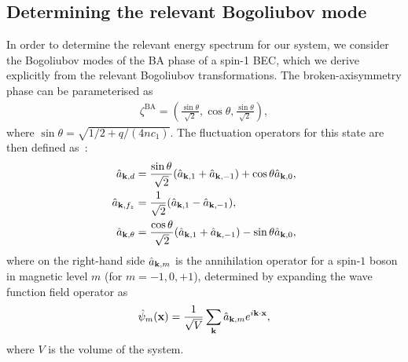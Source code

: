 \subsection{Determining the relevant Bogoliubov mode}\label{subsec: bogoliubov-modes}
In order to determine the relevant energy spectrum for our system, we consider
the Bogoliubov modes of the BA phase of a spin-1 BEC, which we derive explicitly
from the relevant Bogoliubov transformations.
The broken-axisymmetry phase can be parameterised as~\cite{Uchino2010}
\begin{align}
    \zeta^\text{BA} = \left(\frac{\sin\theta}{\sqrt{2}}, \cos\theta,
    \frac{\sin\theta}{\sqrt{2}}\right),
\end{align}
where \(\sin\theta = \sqrt{1/2+q/(4nc_1)}\).
The fluctuation operators for this state are then defined as~\cite{Uchino2010}:
\begin{align}
    \hat{a}_{\vb{k}, d} &= \frac{\sin\theta}{\sqrt{2}}(\hat{a}_{\vb{k}, 1}
    + \hat{a}_{\vb{k}, -1}) + \cos\theta \hat{a}_{\vb{k}, 0}, \\
    \hat{a}_{\vb{k}, f_z} &= \frac{1}{\sqrt{2}}(\hat{a}_{\vb{k}, 1}
    - \hat{a}_{\vb{k}, -1}), \label{eq: a_k-fz}\\
    \hat{a}_{\vb{k}, \theta} &= \frac{\cos\theta}{\sqrt{2}}(\hat{a}_{\vb{k}, 1}
    + \hat{a}_{\vb{k}, -1}) - \sin\theta \hat{a}_{\vb{k}, 0},
\end{align}
where on the right-hand side \(\hat{a}_{\vb{k}, m}\) is the annihilation
operator for a spin-\(1\) boson in magnetic level \(m\) (for \(m=-1,0,+1\)),
determined by expanding the wave function field operator as
\begin{align}
    \hat{\psi}_m(\vb{x}) = \frac{1}{\sqrt{V}}\sum_{\vb{k}}
    \hat{a}_{\vb{k}, m}e^{i\vb{k}\cdot \vb{x}},
\end{align}
where \(V\) is the volume of the system.

